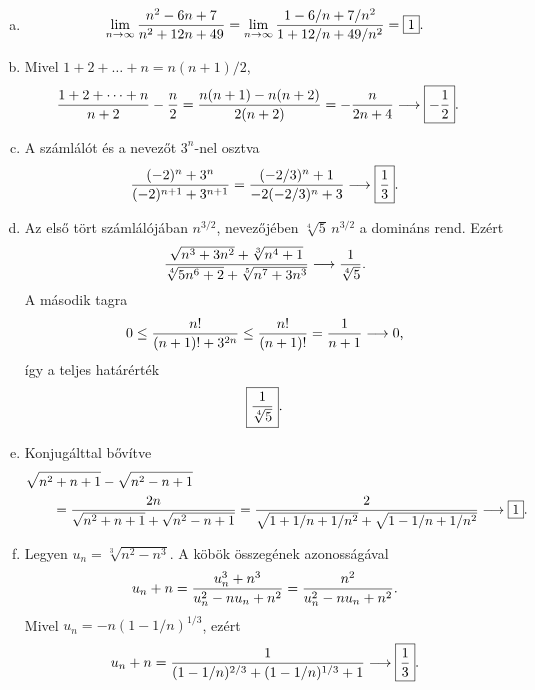 \documentclass{szb-solution}
\begin{document}
\begin{enumerate}[a)]
  \item
        $$
          \lim_{n\to\infty}\frac{n^2-6n+7}{n^2+12n+49}
          =\lim_{n\to\infty}
          \frac{1-6/n+7/n^2}{1+12/n+49/n^2}
          =\boxed{1}
          \text.
        $$

  \item Mivel $1+2+\dots+n=n(n+1)/2$,
        \begin{align*}
          \frac{1+2+\dots+n}{n+2}-\frac n2
          &=\frac{n(n+1)-n(n+2)}{2(n+2)}
          =-\frac{n}{2n+4}
          \longrightarrow\boxed{-\frac12}
          \text.
        \end{align*}

  \item A számlálót és a nevezőt $3^n$-nel osztva
        $$
          \frac{(-2)^n+3^n}{(-2)^{n+1}+3^{n+1}}
          =\frac{(-2/3)^n+1}{-2(-2/3)^n+3}
          \longrightarrow\boxed{\frac13}
          \text.
        $$

  \item Az első tört számlálójában $n^{3/2}$, nevezőjében
        $\sqrt[4]{5}\,n^{3/2}$ a domináns rend. Ezért
        $$
          \frac{\sqrt{n^3+3n^2}+\sqrt[3]{n^4+1}}
          {\sqrt[4]{5n^6+2}+\sqrt[5]{n^7+3n^3}}
          \longrightarrow\frac{1}{\sqrt[4]{5}}
          \text.
        $$
        A második tagra
        $$
          0\leq\frac{n!}{(n+1)!+3^{2n}}
          \leq\frac{n!}{(n+1)!}=\frac{1}{n+1}\longrightarrow0
          \text,
        $$
        így a teljes határérték
        $$
          \boxed{\frac{1}{\sqrt[4]{5}}}
          \text.
        $$

  \item Konjugálttal bővítve
        \begin{align*}
          &\sqrt{n^2+n+1}-\sqrt{n^2-n+1}
          \\
          &\qquad
          =\frac{2n}{\sqrt{n^2+n+1}+\sqrt{n^2-n+1}}
          =\frac{2}{\sqrt{1+1/n+1/n^2}+\sqrt{1-1/n+1/n^2}}
          \longrightarrow\boxed{1}
          \text.
        \end{align*}

  \item Legyen $u_n=\sqrt[3]{n^2-n^3}$. A köbök összegének azonosságával
        $$
          u_n+n
          =\frac{u_n^3+n^3}{u_n^2-nu_n+n^2}
          =\frac{n^2}{u_n^2-nu_n+n^2}
          \text.
        $$
        Mivel $u_n=-n(1-1/n)^{1/3}$, ezért
        $$
          u_n+n
          =\frac{1}
          {(1-1/n)^{2/3}+(1-1/n)^{1/3}+1}
          \longrightarrow\boxed{\frac13}
          \text.
        $$
\end{enumerate}
\end{document}
